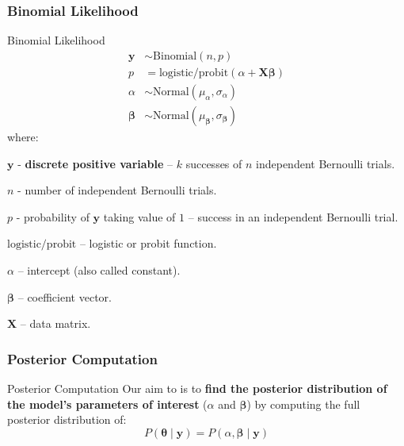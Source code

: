 \subsubsection{Binomial Likelihood}
\begin{frame}{Binomial Likelihood}
	\small
	$$
		\begin{aligned}
			\mathbf{y}         & \sim \text{Binomial}\left(n,  p\right)                                    \\
			p                  & = \text{logistic/probit}(\alpha +  \mathbf{X} \boldsymbol{\beta})         \\
			\alpha             & \sim \text{Normal}(\mu_\alpha, \sigma_\alpha)                             \\
			\boldsymbol{\beta} & \sim \text{Normal}(\mu_{\boldsymbol{\beta}}, \sigma_{\boldsymbol{\beta}})
		\end{aligned}
	$$
	where:
	\begin{vfilleditems}
		\item \small $\mathbf{y}$ - \textbf{discrete positive variable} -- $k$ successes of $n$ independent Bernoulli trials.
		\item \small $n$ - number of independent Bernoulli trials.
		\item \small $p$ - probability of $\mathbf{y}$ taking value of $1$ --
		success in an independent Bernoulli trial.
		\item \small $\text{logistic/probit}$ -- logistic or probit function.
		\item \small $\alpha$ -- intercept (also called constant).
		\item \small $\boldsymbol{\beta}$ -- coefficient vector.
		\item \small $\mathbf{X}$ -- data matrix.
	\end{vfilleditems}
\end{frame}

\subsubsection{Posterior Computation}
\begin{frame}{Posterior Computation}
	Our aim to is to \textbf{find the posterior distribution of the
		model's parameters of interest} ($\alpha$ and $\boldsymbol{\beta}$)
	by computing the full posterior distribution of:
	$$
		P(\boldsymbol{\theta} \mid \mathbf{y}) = P(\alpha, \boldsymbol{\beta} \mid \mathbf{y})
	$$
\end{frame}

